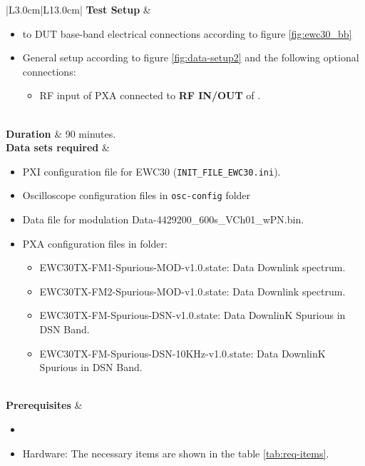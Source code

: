 \begin{table}[H]
\begin{tabular}{|L{3.0cm}|L{13.0cm}|}
	 \textbf{Test Setup} & 
	 \begin{minipage}[t]{\linewidth}
		\begin{itemize}[nosep,after=\strut]
			\item \comEgse{}{} to DUT base-band electrical connections according to figure \ref{fig:ewc30_bb}
			\item General setup according to figure \ref{fig:data-setup2} and the following optional connections:
			\begin{itemize} 
				\item RF input of PXA connected to \textbf{RF IN/OUT} of \comEgse{}. 
			\end{itemize}
		\end{itemize}
		\end{minipage}
	 \\\hline
	 \textbf{Duration} & 90 minutes.\\\hline
	 \textbf{Data sets required} & 
	 \begin{minipage}[t]{\linewidth}
		\begin{itemize}[nosep,after=\strut]
			\item \comEgse{}{} PXI configuration file for EWC30 (\texttt{INIT\_FILE\_EWC30.ini}).
			\item Oscilloscope configuration files in \texttt{osc-config} folder
			\item Data file for modulation Data-4429200\_600s\_VCh01\_wPN.bin.
			\item PXA configuration files in \texttt{\pxaTestFolderName} folder:
				  \begin{itemize}[nosep,after=\strut]
					\item EWC30TX-FM1-Spurious-MOD-v1.0.state: Data Downlink spectrum.%
			        \item EWC30TX-FM2-Spurious-MOD-v1.0.state: Data Downlink spectrum.%
					\item EWC30TX-FM-Spurious-DSN-v1.0.state: Data DownlinK Spurious in DSN Band.%
					 \item EWC30TX-FM-Spurious-DSN-10KHz-v1.0.state: Data DownlinK Spurious in DSN Band.%
				  \end{itemize}
		\end{itemize}
	\end{minipage}\\\hline
	\textbf{Prerequisites} & 
	\begin{minipage}[t]{\linewidth}
		\begin{itemize}[nosep,after=\strut]
			\item \preReqPro
			\item Hardware: The necessary items are shown in the table \ref{tab:req-items}.
		\end{itemize} 
	\end{minipage}\\\hline
\end{tabular}
	\caption{Procedure \subprocid{} \ description. } \label{tb:dataccdf}
	\end{table}

